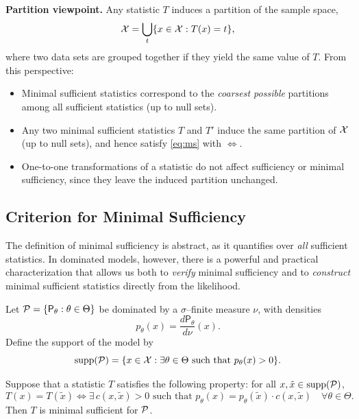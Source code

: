 \medskip

\textbf{Partition viewpoint.}
Any statistic $T$ induces a partition of the sample space,
\[
\mathcal{X} = \bigcup_{t} \{ x \in \mathcal{X} : T(x) = t \},
\]
where two data sets are grouped together if they yield the same value of $T$.
From this perspective:
\begin{itemize}
    \item Minimal sufficient statistics correspond to the \emph{coarsest possible} partitions
    among all sufficient statistics (up to null sets).
    \item Any two minimal sufficient statistics $T$ and $T'$ induce the same partition of
    $\mathcal{X}$ (up to null sets), and hence satisfy \eqref{eq:ms} with $\iff$.
    \item One-to-one transformations of a statistic do not affect sufficiency or minimal
    sufficiency, since they leave the induced partition unchanged.
\end{itemize}

\subsection{Criterion for Minimal Sufficiency}
\label{sub:cms}

The definition of minimal sufficiency is abstract, as it quantifies over \emph{all} sufficient
statistics. In dominated models, however, there is a powerful and practical characterization
that allows us both to \emph{verify} minimal sufficiency and to \emph{construct} minimal sufficient
statistics directly from the likelihood.

\begin{theo}
\label{theo:cms}
Let $\mathcal{P} = \{\mathsf{P}_{\theta} : \theta \in \Theta\}$ be dominated by a $\sigma$--finite measure
$\nu$, with densities
\[
p_{\theta}(x) = \frac{d \mathsf{P}_{\theta}}{d \nu}(x).
\]
Define the support of the model by
\[
\operatorname{supp}(\mathcal{P}) = \{ x \in \mathcal{X} : \exists \theta \in \Theta \text{ such that } p_{\theta}(x) > 0 \}.
\]

Suppose that a statistic $T$ satisfies the following property: for all
$x, \tilde{x} \in \operatorname{supp}(\mathcal{P})$,
\begin{equation}
\label{eq:cms}
T(x) = T(\tilde{x})
\iff
\exists \, c(x,\tilde{x}) > 0 \text{ such that }
p_{\theta}(x) = p_{\theta}(\tilde{x}) \cdot c(x,\tilde{x})
\quad \forall \theta \in \Theta.
\end{equation}
Then $T$ is minimal sufficient for $\mathcal{P}$.
\end{theo}


